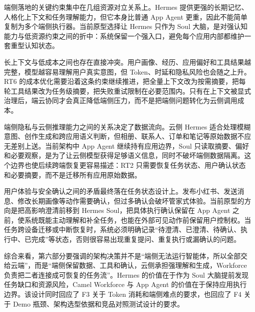 端侧落地的关键约束集中在几组资源对立关系上。Hermes 提供更强的长期记忆、人格化上下文和任务理解能力，但它本身比普通 App Agent 更重，因此不能简单复制为多个端侧执行器。当前原型选择让 Hermes 只作为 Soul 大脑，是对强认知能力与低资源约束之间的折中：系统保留一个强入口，避免每个应用内部都维护一套重型认知状态。

长上下文与低成本之间也存在直接冲突。用户画像、经历、应用偏好和工具结果越完整，模型越容易理解用户真实意图，但 Token、时延和隐私风险也会随之上升。RT6 的成本优化需要沿着这条约束继续推进，把全量上下文改为按需摘要，把每轮工具结果改为任务级摘要，把失败重试限制在必要范围内。只有在上下文被显式治理后，端云协同才会真正降低端侧压力，而不是把端侧问题转化为云侧调用成本。

端侧隐私与云侧推理能力之间的关系决定了数据流向。云侧 Hermes 适合处理模糊意图、创作生成和跨应用语义判断，但相册、联系人、订单和笔记等原始数据不应无差别上送。当前架构中 App Agent 继续持有应用边界，Soul 只读取摘要、偏好和必要观察，是为了让云侧模型获得足够语义信息，同时不破坏端侧数据隔离。这个边界也使后续跨端恢复更容易描述：RT2 只需要恢复任务状态、用户确认状态和必要摘要，而不是迁移所有应用原始数据。

用户体验与安全确认之间的矛盾最终落在任务状态设计上。发布小红书、发送消息、修改长期画像等动作需要确认，但过多确认会破坏管家式体验。当前原型的方向是把高影响澄清前移到 Hermes Soul，把具体执行确认保留在 App Agent 之前，使系统既能主动理解和补全任务，也能在外部可见动作前保留用户控制权。当任务跨设备迁移或中断恢复时，系统必须明确记录“待澄清、已澄清、待确认、执行中、已完成”等状态，否则很容易出现重复提问、重复执行或漏确认的问题。

综合来看，第六部分要强调的架构决策并不是“端侧无法运行智能体，所以全部交给云端”，而是“端侧保留数据、工具和确认，云侧承担强理解和生成，Workforce 负责把二者连接成可恢复的任务流”。Hermes 的价值在于作为 Soul 大脑提前发现任务缺口和资源风险，Camel Workforce 与 App Agent 的价值在于保持应用执行边界。该设计同时回应了 F3 关于 Token 消耗和端侧难点的要求，也回应了 F4 关于 Demo 瓶颈、架构选型依据和竞品对照测试设计的要求。
